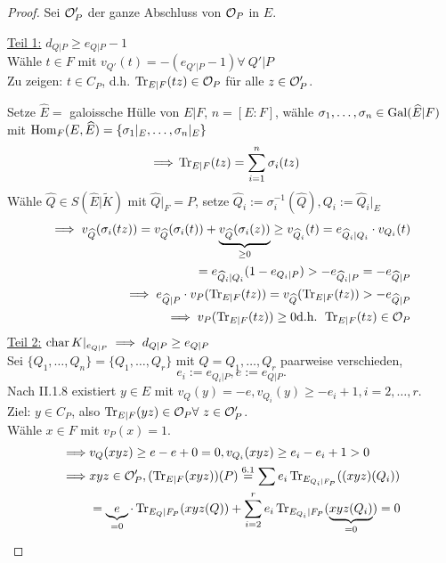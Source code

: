 \begin{proof}
    Sei $\mathcal{O}'_P$ der ganze Abschluss von $\mathcal{O}_P$ in $E$.

    \underline{Teil 1:} $d_{Q|P} \geq e_{Q|P} - 1$\\
    Wähle $t\in F$ mit $v_{Q'}(t) = -(e_{Q'|P}-1) \forall~Q'|P$\\
    Zu zeigen: $t \in C_P$, d.h. $\operatorname{Tr}_{E|F}(tz)\in \mathcal{O}_P$ für alle $z \in \mathcal{O}'_P$.

    \newcommand{\Eh}{\widehat{E}}
    \newcommand{\Qh}{\widehat{Q}}
    Setze $\Eh = $ galoissche Hülle von $E|F$, $n = [E:F]$, wähle $\sigma_1,\ldots,\sigma_n \in \Gal(\Eh|F)$ mit 
    $\Hom_F(E,\Eh)=\{\sigma_1|_E,\ldots,\sigma_n|_E\}$
    \begin{align*}
        \implies & \operatorname{Tr}_{E|F}(tz) = \sum_{i=1}^n \sigma_i(tz) 
    \end{align*}
    Wähle $\Qh \in S(\Eh|\widetilde{K})$ mit $\Qh|_F = P$, setze $\Qh_i := \sigma_i^{-1}(\Qh), Q_i:= \Qh_i|_E$
    \begin{align*}
        \implies v_{\Qh}(\sigma_i(tz)) = v_{\Qh}(\sigma_i(t)) + \underbrace{v_{\Qh}(\sigma_i(z))}_{\geq 0} \geq
        v_{\Qh_i}(t) = e_{\Qh_i|Q_i}\cdot v_{Q_i}(t)\\
        = e_{\Qh_i|Q_i}(1-e_{Q_i|P}) > - e_{\Qh_i|P} = -e_{\Qh|P}\\
        \implies e_{\Qh|P} \cdot v_P(\Tr_{E|F}(tz)) = v_{\Qh}(\Tr_{E|F}(tz)) > - e_{\Qh|P}\\
        \implies v_P(\Tr_{E|F}(tz)) \geq 0 \text{d.h. } \Tr_{E|F}(tz) \in \O_P 
    \end{align*}
    \underline{Teil 2:} $\operatorname{char} K|_{e_{Q|P}} \implies d_{Q|P} \geq e_{Q|P}$\\
    Sei $\{Q_1,\ldots,Q_n\} = \{Q_1,\ldots,Q_r\}$ mit $Q = Q_1,\ldots,Q_r$ paarweise verschieden,
    $$ e_i := e_{Q_i|P}, e:= e_{Q|P}.$$
    Nach II.1.8 existiert $y \in E$ mit $v_Q(y) = -e, v_{Q_i}(y) \geq - e_i + 1, i=2,\ldots,r$.\\
    Ziel: $y \in C_P$, also $\operatorname{Tr}_{E|F}(yz) \in \mathcal{O}_P \forall~ z\in \mathcal{O}'_P$.\\
    Wähle $x \in F$ mit $v_P(x) = 1$.
    \begin{align*}
        \implies & v_Q(xyz) \geq e-e+0 = 0, v_{Q_i}(xyz) \geq e_i - e_i +1 > 0\\
        \implies & xyz \in \O'_P, (\Tr_{E|F}(xyz))(P) \stackeq{6.1} \sum e_i \Tr_{E_{Q_i|F_P}}((xyz)(Q_i))\\
        & = \underbrace{e}_{=0} \cdot \Tr_{E_Q|F_P}(xyz(Q)) + \sum_{i=2}^r e_i \Tr_{E_{Q_i}|F_P}(\underbrace{xyz(Q_i)}_{=0})=0\\

\end{align*}
\end{proof}
